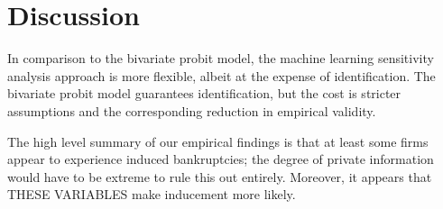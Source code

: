 \documentclass[aoas,preprint, 11pt, dvipsnames, table, x11name]{imsart}
\theoremstyle{remark}
\begin{document}
\section{Discussion}

In comparison to the bivariate probit model, the machine learning sensitivity analysis approach is more flexible, albeit at the expense of identification.  The bivariate probit model guarantees identification, but the cost is stricter assumptions and the corresponding reduction in empirical validity. %

The high level summary of our empirical findings is that at least some firms appear to experience induced bankruptcies; the degree of private information would have to be extreme to rule this out entirely. Moreover, it appears that {\color{red} THESE VARIABLES make inducement more likely}.

\end{document}
